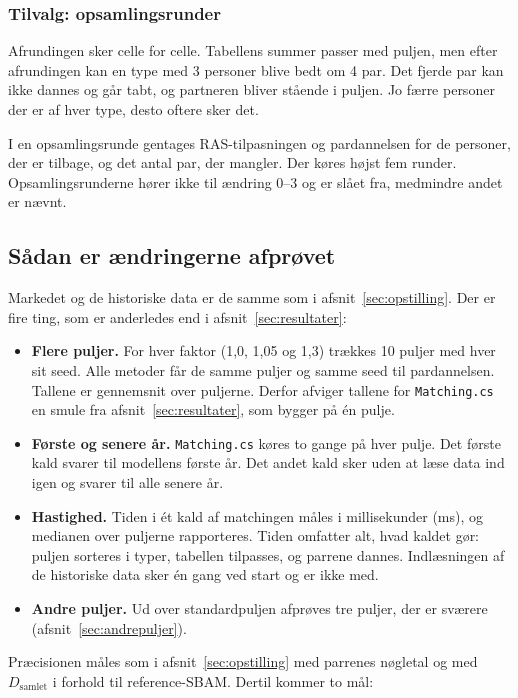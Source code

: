 \documentclass[11pt,a4paper]{article}
\newcommand{\kode}[1]{\texttt{#1}}
\begin{document}
\subsubsection*{Tilvalg: opsamlingsrunder}

Afrundingen sker celle for celle. Tabellens summer passer med puljen, men efter afrundingen kan en
type med 3 personer blive bedt om 4 par. Det fjerde par kan ikke dannes og går tabt, og partneren
bliver stående i puljen. Jo færre personer der er af hver type, desto oftere sker det.

I en opsamlingsrunde gentages RAS-tilpasningen og pardannelsen for de personer, der er tilbage, og
det antal par, der mangler. Der køres højst fem runder. Opsamlingsrunderne hører ikke til ændring
0--3 og er slået fra, medmindre andet er nævnt.

\subsection{Sådan er ændringerne afprøvet}

Markedet og de historiske data er de samme som i afsnit~\ref{sec:opstilling}. Der er fire ting, som
er anderledes end i afsnit~\ref{sec:resultater}:

\begin{itemize}
\item \textbf{Flere puljer.} For hver faktor (1,0, 1,05 og 1,3) trækkes 10 puljer med hver sit seed.
Alle metoder får de samme puljer og samme seed til pardannelsen. Tallene er gennemsnit over
puljerne. Derfor afviger tallene for \kode{Matching.cs} en smule fra
afsnit~\ref{sec:resultater}, som bygger på én pulje.
\item \textbf{Første og senere år.} \kode{Matching.cs} køres to gange på hver pulje. Det første
kald svarer til modellens første år. Det andet kald sker uden at læse data ind igen og svarer til
alle senere år.
\item \textbf{Hastighed.} Tiden i ét kald af matchingen måles i millisekunder (ms), og medianen over
puljerne rapporteres. Tiden omfatter alt, hvad kaldet gør: puljen sorteres i typer, tabellen
tilpasses, og parrene dannes. Indlæsningen af de historiske data sker én gang ved start og er ikke
med.
\item \textbf{Andre puljer.} Ud over standardpuljen afprøves tre puljer, der er sværere
(afsnit~\ref{sec:andrepuljer}).
\end{itemize}

Præcisionen måles som i afsnit~\ref{sec:opstilling} med parrenes nøgletal og med
$D_{\text{samlet}}$ i forhold til reference-SBAM. Dertil kommer to mål:
\end{document}
